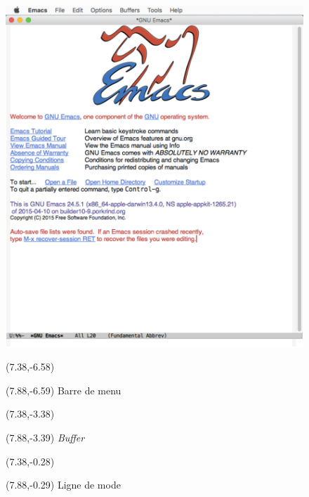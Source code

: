 \begin{figure}[t]
  \includegraphics{emacswindow-screenshot}

  \begingroup
  \begin{textblock}{0.35}(7.38,-6.58)
    \Large\faLongArrowRight
  \end{textblock}
  \begin{textblock}{1.75}(7.88,-6.59)
    \footnotesize\sffamily Barre de menu
  \end{textblock}

  \begin{textblock}{0.35}(7.38,-3.38)
    \Large\faLongArrowRight
  \end{textblock}
  \begin{textblock}{1.75}(7.88,-3.39)
    \footnotesize\sffamily \emph{Buffer}
  \end{textblock}

  \begin{textblock}{0.35}(7.38,-0.28)
    \Large\faLongArrowRight
  \end{textblock}
  \begin{textblock}{1.75}(7.88,-0.29)
    \footnotesize\sffamily Ligne de mode
  \end{textblock}


\end{figure}
